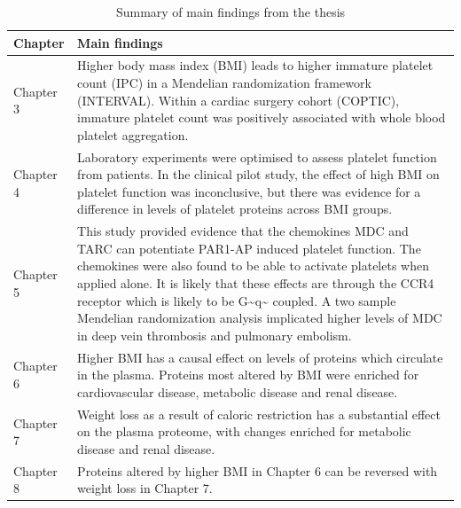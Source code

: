 \documentclass[11pt,twoside]{bristolthesis}
\begin{document}
\begin{landscape}\begin{table}

\caption{\label{tab:main-thesis-findings}Summary of main findings from the thesis}
\centering
\begin{tabu} to 
\toprule
Chapter & Main findings\\
\midrule
Chapter 3 & Higher body mass index (BMI) leads to higher immature platelet count (IPC) in a Mendelian randomization framework (INTERVAL). Within a cardiac surgery cohort (COPTIC), immature platelet count was positively associated with whole blood platelet aggregation.\\
Chapter 4 & Laboratory experiments were optimised to assess platelet function from patients. In the clinical pilot study, the effect of high BMI on platelet function was inconclusive, but there was evidence for a difference in levels of platelet proteins across BMI groups.\\
Chapter 5 & This study provided evidence that the chemokines MDC and TARC can potentiate PAR1-AP induced platelet function. The chemokines were also found to be able to activate platelets when applied alone. It is likely that these effects are through the CCR4 receptor which is likely to be G\textasciitilde{}q\textasciitilde{} coupled. A two sample Mendelian randomization analysis implicated higher levels of MDC in deep vein thrombosis and pulmonary embolism.\\
Chapter 6 & Higher BMI has a causal effect on levels of proteins which circulate in the plasma. Proteins most altered by BMI were enriched for cardiovascular disease, metabolic disease and renal disease.\\
Chapter 7 & Weight loss as a result of caloric restriction has a substantial effect on the plasma proteome, with changes enriched for metabolic disease and renal disease.\\
\addlinespace
Chapter 8 & Proteins altered by higher BMI in Chapter 6 can be reversed with weight loss in Chapter 7.\\
\bottomrule
\end{tabu}
\end{table}
\end{landscape}
\end{document}
